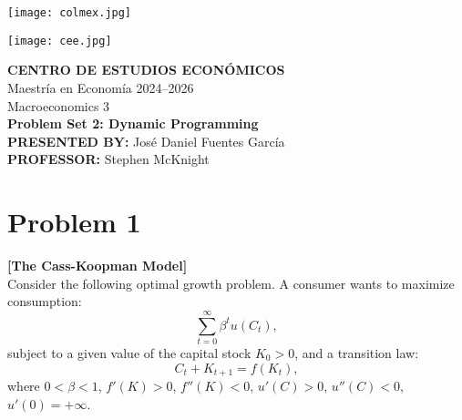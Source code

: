\documentclass[12pt]{article}
\title{}
\author{}
\date{}
\begin{document}
\begin{titlepage}
    \vspace*{-1cm}
    \noindent
    \begin{minipage}[t]{0.49\textwidth}
        \texttt{[image: colmex.jpg]}
    \end{minipage}%
    \begin{minipage}[t]{0.49\textwidth}
        \raggedleft
        \texttt{[image: cee.jpg]}
    \end{minipage}

    \vspace*{2cm}

    \begin{center}
        \Huge \textbf{CENTRO DE ESTUDIOS ECONÓMICOS} \\[1.5em]
        \Large Maestría en Economía 2024--2026 \\[2em]
        \Large Macroeconomics 3 \\[3em]
        \LARGE \textbf{Problem Set 2: Dynamic Programming} \\[3em]
        \large \textbf{PRESENTED BY:} José Daniel Fuentes García \\[3em]
        \large \textbf{PROFESSOR:} Stephen McKnight \\[0.9em]
        
    \end{center}

    \vfill
\end{titlepage}

\newpage

\setcounter{secnumdepth}{2}
\setcounter{tocdepth}{3}
\tableofcontents


\newpage

\section*{\noindent\textbf{Problem 1}}

\noindent\textbf{[The Cass-Koopman Model]}\\

\noindent Consider the following optimal growth problem. A consumer wants to maximize consumption:
\[
\sum_{t=0}^{\infty} \beta^t u(C_t),
\]
subject to a given value of the capital stock \( K_0 > 0 \), and a transition law:
\[
C_t + K_{t+1} = f(K_t),
\]
where \( 0 < \beta < 1 \), \( f'(K) > 0 \), \( f''(K) < 0 \), \( u'(C) > 0 \), \( u''(C) < 0 \), \( u'(0) = +\infty \).
\end{document}
